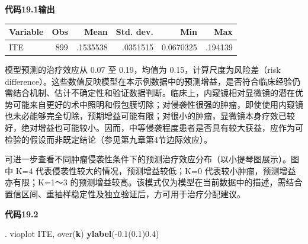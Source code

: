 \documentclass[
  chinese-hans,
  letterpaper,
  DIV=11,
  numbers=noendperiod]{scrreprt}
\newenvironment{Shaded}{\begin{snugshade}}{\end{snugshade}}
\newcommand{\BaseNTok}[1]{\textcolor[rgb]{0.68,0.00,0.00}{#1}}
\newcommand{\KeywordTok}[1]{\textcolor[rgb]{0.00,0.23,0.31}{\textbf{#1}}}
\newcommand{\NormalTok}[1]{\textcolor[rgb]{0.00,0.23,0.31}{#1}}
\newcounter{none} %
\begin{document}
\begin{tcolorbox}[enhanced jigsaw, arc=.35mm, bottomrule=.15mm, breakable, colback=white, colframe=quarto-callout-note-color-frame, left=2mm, leftrule=.75mm, opacityback=0, rightrule=.15mm, toprule=.15mm]

\vspace{-3mm}\textbf{代码19.1输出}\vspace{3mm}

{\def\LTcaptype{none} %
\begin{longtable}[]{@{}lrrrrr@{}}
\toprule\noalign{}
Variable & Obs & Mean & Std. dev. & Min & Max \\
\midrule\noalign{}
\endhead
\bottomrule\noalign{}
\endlastfoot
ITE & 899 & .1535538 & .0351515 & 0.0670325 & .194139 \\
\end{longtable}
}

\end{tcolorbox}

模型预测的治疗效应从 0.07 至 0.19，均值为 0.15，计算尺度为风险差（risk
difference）。这些数值反映模型在本示例数据中的预测增益，是否符合临床经验仍需结合机制、估计不确定性和验证数据判断。临床上，内窥镜相对显微镜的潜在优势可能来自更好的术中照明和假包膜切除；对侵袭性很强的肿瘤，即使使用内窥镜也未必能够完全切除，预期增益可能有限；对很小的肿瘤，显微镜本身疗效已较好，绝对增益也可能较小。因而，中等侵袭程度患者是否具有较大获益，应作为可检验的假设而非既定结论（参见第九章第4节边际效应）。

可进一步查看不同肿瘤侵袭性条件下的预测治疗效应分布（以小提琴图展示）。图中
K=4 代表侵袭性较大的情况，预测增益较低；K=0
代表较小肿瘤，预测增益亦有限；K=1～3
的预测增益较高。该模式仅为模型在当前数据中的描述，需结合置信区间、重抽样稳定性及独立验证后，方可用于治疗分配建议。

\begin{tcolorbox}[enhanced jigsaw, arc=.35mm, bottomrule=.15mm, breakable, colback=white, colframe=quarto-callout-note-color-frame, left=2mm, leftrule=.75mm, opacityback=0, rightrule=.15mm, toprule=.15mm]

\vspace{-3mm}\textbf{代码19.2}\vspace{3mm}

\begin{Shaded}
\begin{Highlighting}[]
\NormalTok{. vioplot ITE, }\BaseNTok{over}\NormalTok{(}\KeywordTok{k}\NormalTok{) }\KeywordTok{ylabel}\NormalTok{({-}0.1(0.1)0.4)}
\end{Highlighting}
\end{Shaded}

\end{tcolorbox}
\end{document}
